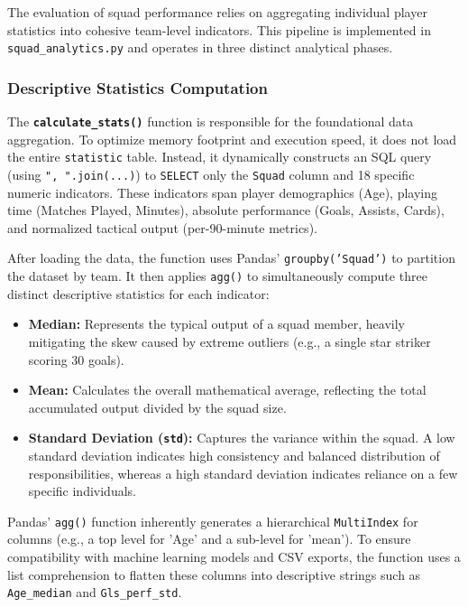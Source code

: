 \documentclass[a4paper,12pt]{report}
\begin{document}
The evaluation of squad performance relies on aggregating individual player statistics into cohesive team-level indicators. This pipeline is implemented in \texttt{squad\_}\allowbreak\texttt{analytics.}\allowbreak\texttt{py} and operates in three distinct analytical phases.

\subsubsection{Descriptive Statistics Computation}

The \textbf{\texttt{calculate\_}\allowbreak\texttt{stats()}} function is responsible for the foundational data aggregation. To optimize memory footprint and execution speed, it does not load the entire \texttt{statistic} table. Instead, it dynamically constructs an SQL query (using \texttt{", ".join(...)}) to \texttt{SELECT} only the \texttt{Squad} column and 18 specific numeric indicators. These indicators span player demographics (Age), playing time (Matches Played, Minutes), absolute performance (Goals, Assists, Cards), and normalized tactical output (per-90-minute metrics).

After loading the data, the function uses Pandas' \texttt{groupby('Squad')} to partition the dataset by team. It then applies \texttt{agg()} to simultaneously compute three distinct descriptive statistics for each indicator:
\begin{itemize}
    \item \textbf{Median:} Represents the typical output of a squad member, heavily mitigating the skew caused by extreme outliers (e.g., a single star striker scoring 30 goals).
    \item \textbf{Mean:} Calculates the overall mathematical average, reflecting the total accumulated output divided by the squad size.
    \item \textbf{Standard Deviation (\texttt{std}):} Captures the variance within the squad. A low standard deviation indicates high consistency and balanced distribution of responsibilities, whereas a high standard deviation indicates reliance on a few specific individuals.
\end{itemize}

\begin{sloppypar}
Pandas' \texttt{agg()} function inherently generates a hierarchical \texttt{Multi}\allowbreak\texttt{Index} for columns (e.g., a top level for 'Age' and a sub-level for 'mean'). To ensure compatibility with machine learning models and CSV exports, the function uses a list comprehension to flatten these columns into descriptive strings such as \texttt{Age\_}\allowbreak\texttt{median} and \texttt{Gls\_}\allowbreak\texttt{perf\_}\allowbreak\texttt{std}.
\end{sloppypar}
\end{document}
